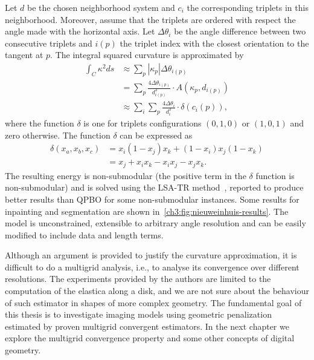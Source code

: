 Let $d$ be the chosen neighborhood system and $c_i$ the corresponding triplets in this neighborhood. Moreover, assume that the triplets are ordered with respect the angle made with the horizontal axis. Let $\Delta \theta_i$ be the angle difference between two consecutive triplets and $i(p)$ the triplet index with the closest orientation to the tangent at $p$. The integral squared curvature is approximated by 
\begin{align*}
	\int_{C}{\kappa ^2 ds} &\approx \sum_{p}{ |\kappa_{p}|\Delta \theta_{i(p)}} \\
	&= \sum_{p} \frac{4\Delta \theta _{i(p)}}{d^3_{i(p)}} \cdot A(\kappa_p,d_{i(p)}) \\
	&\approx \sum_{i}\sum_{p} \frac{4\Delta \theta _i}{d^3_i} \cdot \delta(c_i(p)),
\end{align*}
%
where the function $\delta$ is one for triplets configurations $(0,1,0)$ or $(1,0,1)$ and zero otherwise. The function $\delta$ can be expressed as
\begin{align*}
	\delta(x_a,x_b,x_c) &= x_i(1-x_j)x_k + (1-x_i)x_j(1-x_k) \\
	&= x_j + x_ix_k - x_ix_j - x_jx_k.
\end{align*}
%
The resulting energy is non-submodular (the positive term in the $\delta$ function is non-submodular) and is solved using the LSA-TR method~\cite{gorelick14local}, reported to produce better results than QPBO for some non-submodular instances. Some results for inpainting and segmentation are shown in~\cref{ch3:fig:nieuweinhuis-results}. The model is unconstrained, extensible to arbitrary angle resolution and can be easily modified to include data and length terms. 

Although an argument is provided to justify the curvature approximation, it is difficult to do a multigrid analysis, i.e., to analyse its convergence over different resolutions. The experiments provided by the authors are limited to the computation of the elastica along a disk, and we are not sure about the behaviour of such estimator in shapes of more complex geometry. The fundamental goal of this thesis is to investigate imaging models using geometric penalization estimated by proven multigrid convergent estimators. In the next chapter we explore the multigrid convergence property and some other concepts of digital geometry.

